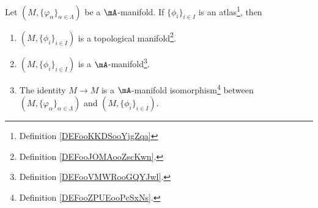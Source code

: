 \begin{proposition}	\label{PROPooCSDZooFGxRnh}
	Let \( (M,\{ \varphi_{\alpha} \}_{\alpha\in \Lambda})\) be a \( \mA\)-manifold. If \( \{ \phi_i \}_{i\in I}\) is an atlas\footnote{Definition \ref{DEFooKKDSooYjgZqa}}, then
	\begin{enumerate}
		\item	\label{ITEMooRITLooZhpCWe}
		      \( (M,\{ \phi_i \}_{i\in I})\) is a topological manifold\footnote{Definition \ref{DEFooJOMAooZscKwn}.}.
		\item		\label{ITEMooHOSKooSPWPil}
		      \( (M,\{ \phi_i \}_{i\in I})\) is a \( \mA\)-manifold\footnote{Definition \ref{DEFooVMWRooGQYJwl}.}.
		\item		\label{ITEMooMFLSooEDiIsa}
		      The identity \( M\to M\) is a \( \mA\)-manifold isomorphism\footnote{Definition \ref{DEFooZPUEooPcSxNs}.} between \( (M,\{ \varphi_{\alpha} \}_{\alpha\in \Lambda})\) and \( (M,\{ \phi_i \}_{i\in I})\).
	\end{enumerate}
\end{proposition}

